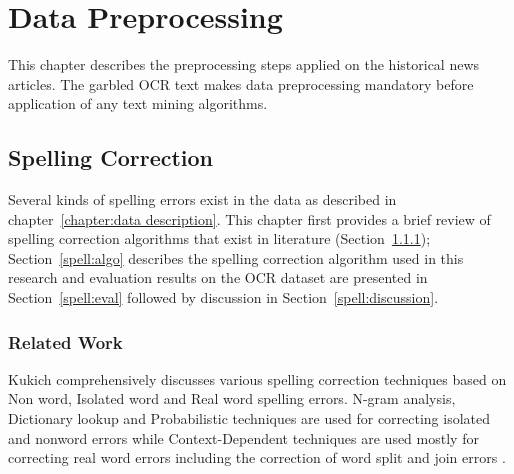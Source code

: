 \documentclass[letterpaper,11pt]{report}
\begin{document}
\chapter{Data Preprocessing}
\label{chapter:data preprocessing} 

 
This chapter describes the preprocessing steps applied on the historical news articles.
The garbled OCR text makes data preprocessing mandatory before application of any text mining algorithms. 

\section{Spelling Correction}

Several kinds of spelling errors exist in the data as described in chapter~\ref{chapter:data description}. This chapter first provides a brief review of spelling correction algorithms that exist in literature (Section~\ref{spell:rw}); Section~\ref{spell:algo} describes the spelling correction algorithm used in this research and evaluation results on the OCR dataset are presented in Section~\ref{spell:eval} followed by discussion in Section~\ref{spell:discussion}.



\subsection{Related Work}
\label{spell:rw}

Kukich\cite{kukich1992techniques} comprehensively discusses various spelling correction techniques based on Non word, Isolated word and Real word spelling errors. N-gram analysis, Dictionary lookup and Probabilistic techniques are used for correcting isolated and nonword errors while Context-Dependent techniques are used mostly for correcting real word errors including the correction of word split and join errors \cite{elmi1998spelling}.
\end{document}

